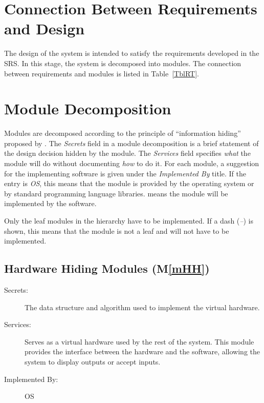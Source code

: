 \documentclass[12pt, titlepage]{article}
\newcommand{\mref}[1]{M\ref{#1}}
\begin{document}
\section{Connection Between Requirements and Design} \label{SecConnection}

The design of the system is intended to satisfy the requirements developed in
the SRS. In this stage, the system is decomposed into modules. The connection
between requirements and modules is listed in Table~\ref{TblRT}.


\section{Module Decomposition} \label{SecMD}

Modules are decomposed according to the principle of ``information hiding''
proposed by \citet{ParnasEtAl1984}. The \emph{Secrets} field in a module
decomposition is a brief statement of the design decision hidden by the
module. The \emph{Services} field specifies \emph{what} the module will do
without documenting \emph{how} to do it. For each module, a suggestion for the
implementing software is given under the \emph{Implemented By} title. If the
entry is \emph{OS}, this means that the module is provided by the operating
system or by standard programming language libraries.  \emph{\progname{}} means the
module will be implemented by the \progname{} software.

Only the leaf modules in the hierarchy have to be implemented. If a dash
(\emph{--}) is shown, this means that the module is not a leaf and will not have
to be implemented.

\subsection{Hardware Hiding Modules (\mref{mHH})}

\begin{description}
\item[Secrets:] The data structure and algorithm used to implement the virtual hardware.
\item[Services:] Serves as a virtual hardware used by the rest of the system. This module provides the interface between the hardware and the software, allowing the system to display outputs or accept inputs.
\item[Implemented By:] OS
\end{description}
\end{document}
